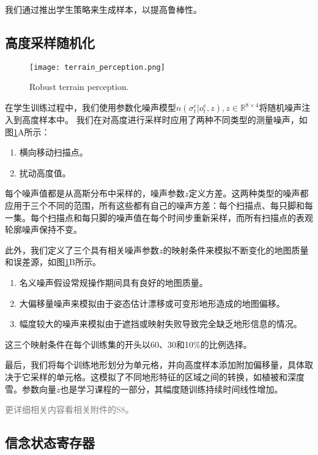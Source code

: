 我们通过推出学生策略来生成样本，以提高鲁棒性\cite[p]{Ross_Gordon_Bagnell_2010,Czarnecki_Pascanu_Osindero_Jayakumar_Swirszcz_Jaderberg_2019}。

\subsection[高度采样随机化]{高度采样随机化}

\begin{figure}
  \centering
  \texttt{[image: terrain\_perception.png]}
  \caption{Robust terrain perception\cite[p10]{Miki_Lee_Hwangbo_Wellhausen_Koltun_Hutter_2022}.}
  \label{fig:terrain_perception}
\end{figure}

在学生训练过程中，我们使用参数化噪声模型$n(\sigma_t^e|o_t^e,z),z\in \mathbb{R}^{8\times 4}$将随机噪声注入到高度样本中。
我们在对高度进行采样时应用了两种不同类型的测量噪声，如图\ref{fig:terrain_perception}A所示：
\begin{enumerate}
  \item 横向移动扫描点。
  \item 扰动高度值。
\end{enumerate}

每个噪声值都是从高斯分布中采样的，噪声参数$z$定义方差。这两种类型的噪声都应用于三个不同的范围，所有这些都有自己的噪声方差：每个扫描点、每只脚和每一集。每个扫描点和每只脚的噪声值在每个时间步重新采样，而所有扫描点的表观轮廓噪声保持不变。

此外，我们定义了三个具有相关噪声参数$z$的映射条件来模拟不断变化的地图质量和误差源，如图\ref{fig:terrain_perception}B所示。
\begin{enumerate}
  \item 名义噪声假设常规操作期间具有良好的地图质量。
  \item 大偏移量噪声来模拟由于姿态估计漂移或可变形地形造成的地图偏移。
  \item 幅度较大的噪声来模拟由于遮挡或映射失败导致完全缺乏地形信息的情况。
\end{enumerate}

这三个映射条件在每个训练集的开头以60、30和10\%的比例选择。

最后，我们将每个训练地形划分为单元格，并向高度样本添加附加偏移量，具体取决于它采样的单元格。这模拟了不同地形特征的区域之间的转换，如植被和深度雪。参数向量$z$也是学习课程的一部分，其幅度随训练持续时间线性增加。

\textcolor{gray}{\small 更详细相关内容看相关附件的S8。}

\subsection[信念状态寄存器]{信念状态寄存器}

